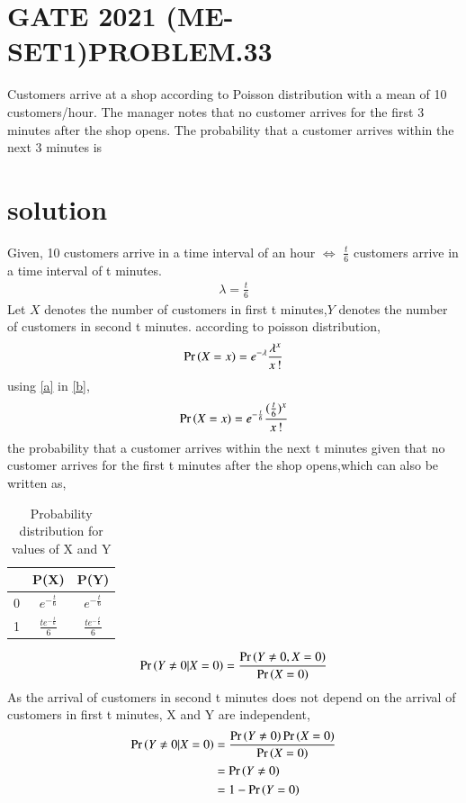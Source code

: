 \documentclass[journal,12pt,twocolumn]{IEEEtran}
\begin{document}
\section{GATE 2021 (ME-SET1)PROBLEM.33}
Customers arrive at a shop according to Poisson distribution with a mean of 10 customers/hour. The manager notes that no customer arrives for the first 3 minutes after the shop opens. The probability that a customer arrives within the next 3 minutes is
\section{solution}
Given, 
10 customers arrive in a time interval of an hour $\iff$ $\frac{t}{6}$ customers arrive in a time interval of t minutes.
\begin{align}
\lambda = \frac{t}{6} \label{a}
\end{align}
Let $X$ denotes the number of customers in first t minutes,$Y$ denotes the number of customers in second t minutes.
according to  poisson distribution,
\begin{align}
\Pr\left(X=x\right)= e^{-\lambda} \frac{\lambda^{x}}{x\,!} \label{b}
\end{align}
using \eqref{a} in \eqref{b},
\begin{align}
\Pr\left(X=x\right)= e^{-\frac{t}{6}} \frac{(\frac{t}{6})^{x}}{x\,!} \label{c}
\end{align}
 the probability that a customer arrives within the next t minutes given that no customer arrives for the first t minutes after the shop opens,which can also be written as,
\begin{table}[ht]
\caption{Probability distribution for values of X and Y}
\begin{center}
    \begin{tabular}{|c|c|c|}
    \hline
     & P(X)&P(Y)\\
    \hline
    0& $e^{-\frac{t}{6}}$& $e^{-\frac{t}{6}}$\\
    \hline
    1 & $\frac{t e^{-\frac{t}{6}}}{6}$ & $\frac{t e^{-\frac{t}{6}}}{6}$\\
    \hline
    \end{tabular}
\end{center} 
\end{table}
\begin{align}
\Pr\left(Y\neq 0|X=0\right)=\frac{\Pr\left(Y\neq 0,X=0\right)}{\Pr\left(X=0\right)}
\end{align}
As the arrival of customers in second t minutes does not depend on the arrival of customers in first t minutes, X and Y are independent,
\begin{align}
\Pr\left(Y\neq 0|X=0\right)&=\frac{\Pr\left(Y\neq 0\right)\Pr\left(X=0\right)}{\Pr\left(X=0\right)}\\
&=\Pr\left(Y\neq 0\right)\\
&= 1-\Pr\left(Y=0\right) 
\end{align}
\end{document}
